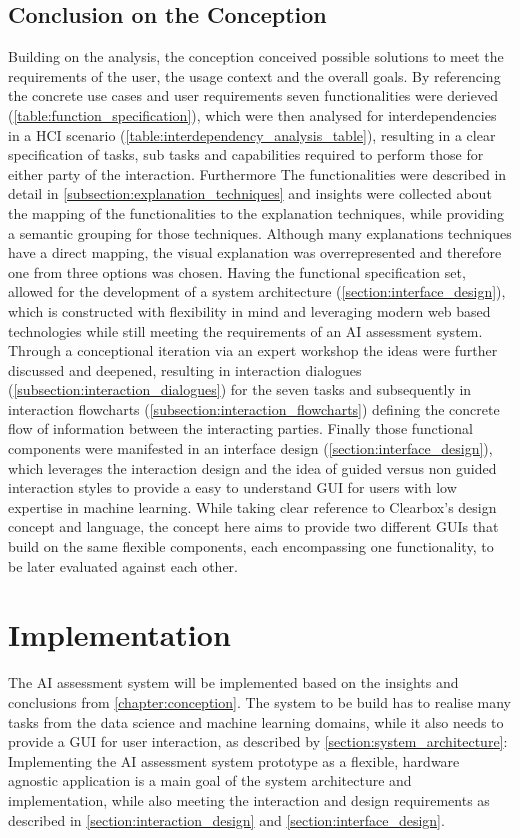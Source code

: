 \documentclass[11pt,a4paper,english]{scrreprt}
\begin{document}
\section{Conclusion on the Conception}
Building on the analysis, the conception conceived possible solutions to meet the requirements of the user, the usage context and the overall goals. By referencing the concrete use cases and user requirements seven functionalities were derieved (\autoref{table:function_specification}), which were then analysed for interdependencies in a HCI scenario (\autoref{table:interdependency_analysis_table}), resulting in a clear specification of tasks, sub tasks and capabilities required to perform those for either party of the interaction. Furthermore The functionalities were described in detail in \autoref{subsection:explanation_techniques} and insights were collected about the mapping of the functionalities to the explanation techniques, while providing a semantic grouping for those techniques. Although many explanations techniques have a direct mapping, the visual explanation was overrepresented and therefore one from three options was chosen. Having the functional specification set, allowed for the development of a system architecture (\autoref{section:interface_design}), which is constructed with flexibility in mind and leveraging modern web based technologies while still meeting the requirements of an AI assessment system. Through a conceptional iteration via an expert workshop the ideas were further discussed and deepened, resulting in interaction dialogues (\autoref{subsection:interaction_dialogues}) for the seven tasks and subsequently in interaction flowcharts (\autoref{subsection:interaction_flowcharts}) defining the concrete flow of information between the interacting parties. Finally those functional components were manifested in an interface design (\autoref{section:interface_design}), which leverages the interaction design and the idea of guided versus non guided interaction styles to provide a easy to understand GUI for users with low expertise in machine learning. While taking clear reference to Clearbox's design concept and language, the concept here aims to provide two different GUIs that build on the same flexible components, each encompassing one functionality, to be later evaluated against each other.

\newpage
\chapter{Implementation}\label{chapter:implementation}
The AI assessment system will be implemented based on the insights and conclusions from \autoref{chapter:conception}. The system to be build has to realise many tasks from the data science and machine learning domains, while it also needs to provide a GUI for user interaction, as described by \autoref{section:system_architecture}: Implementing the AI assessment system prototype as a flexible, hardware agnostic application is a main goal of the system architecture and implementation, while also meeting the interaction and design requirements as described in \autoref{section:interaction_design} and \autoref{section:interface_design}.
\end{document}
